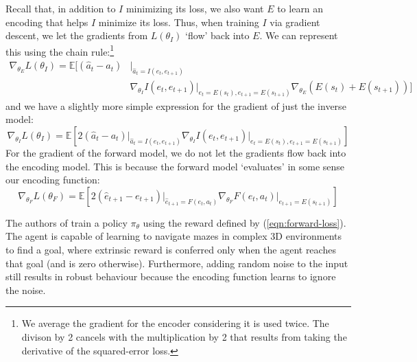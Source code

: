 \documentclass[journal, onecolumn, 12pt, draftclsnofoot]{IEEEtran}
\begin{document}
	\par Recall that, in addition to $I$ minimizing its loss, we also want $E$ to learn an encoding that helps $I$ minimize its loss. Thus, when training $I$ via gradient descent, we let the gradients from $L(\theta_I)$ `flow' back into $E$. We can represent this using the chain rule:\footnote{We average the gradient for the encoder considering it is used twice. The divison by 2 cancels with the multiplication by 2 that results from taking the derivative of the squared-error loss.}
	\begin{align}
		\label{eqn:encoding-loss}
		\nabla_{\theta_E} L(\theta_I) = \mathbb{E} \Big[ (\hat{a}_t - a_t) & \big\vert_{\hat{a}_t = I(e_t, e_{t+1})} \\ & \nabla_{\theta_I} I(e_t, e_{t+1}) \big\vert_{e_{t} = E(s_{t}), e_{t+1} = E(s_{t+1})} \nabla_{\theta_E} \left( E(s_t) + E(s_{t+1}) \right) \Big]
	\end{align}
	and we have a slightly more simple expression for the gradient of just the inverse model:
	\begin{equation}
		\label{eqn:inverse-loss-gradient}
		\nabla_{\theta_I} L(\theta_I) = \mathbb{E} \left[ 2 (\hat{a}_t - a_t) \big\vert_{\hat{a}_t = I(e_t, e_{t+1})} \nabla_{\theta_I} I(e_t, e_{t+1}) \big\vert_{e_{t} = E(s_{t}), e_{t+1} = E(s_{t+1})} \right]
	\end{equation}
	For the gradient of the forward model, we do not let the gradients flow back into the encoding model. This is because the forward model `evaluates' in some sense our encoding function:
	\begin{equation}
		\label{eqn:forward-loss-grad}
		\nabla_{\theta_F} L(\theta_F) = \mathbb{E} \left[ 2 (\hat{e}_{t+1} - e_{t+1})
		 \big\vert_{\hat{e}_{t+1} = F(e_t, a_t)}
		  \nabla_{\theta_F} F(e_t, a_t)
			\big\vert_{e_{t+1} = E(s_{t+1})} \right]
	\end{equation}
	\par The authors of \cite{icm} train a policy $\pi_\theta$ using the reward defined by (\ref{eqn:forward-loss}). The agent is capable of learning to navigate mazes in complex 3D environments to find a goal, where extrinsic reward is conferred only when the agent reaches that goal (and is zero otherwise). Furthermore, adding random noise to the input still results in robust behaviour because the encoding function learns to ignore the noise.
\end{document}
